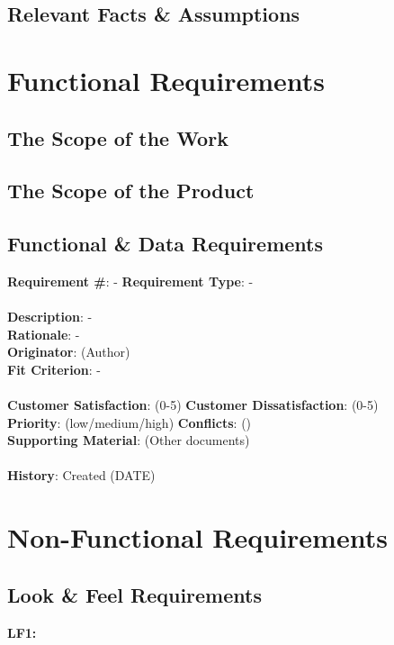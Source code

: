 \documentclass[titlepage]{article}
\begin{document}
\subsection{Relevant Facts \& Assumptions}


\section{Functional Requirements}
\subsection{The Scope of the Work}

\subsection{The Scope of the Product}

\subsection{Functional \& Data Requirements}
\begin{framed}
\noindent\textbf{Requirement \#}: - \hfill \textbf{Requirement Type}: - \hfill\\\\
\noindent\textbf{Description}: -\\
\textbf{Rationale}: -\\
\textbf{Originator}: (Author)\\
\textbf{Fit Criterion}: -\\\\
\noindent\textbf{Customer Satisfaction}: (0-5) \hfill 	\textbf{Customer Dissatisfaction}: (0-5) \hfill\\
\textbf{Priority}: (low/medium/high) \hfill \textbf{Conflicts}: () \hfill 		\\
\textbf{Supporting Material}: (Other documents)\\\\
\noindent\textbf{History}: Created (DATE)
\end{framed}


\section{Non-Functional Requirements}
\subsection{Look \& Feel Requirements}
\textbf{LF1:} %
\end{document}
